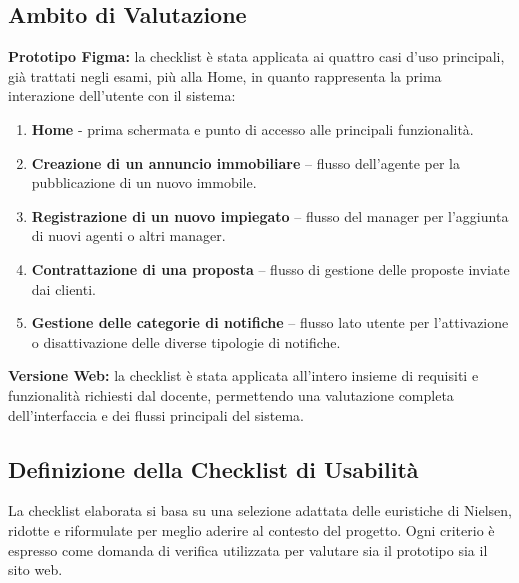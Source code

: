 \subsection*{Ambito di Valutazione}

\textbf{Prototipo Figma:} la checklist è stata applicata ai quattro casi d’uso principali, già trattati negli esami, più alla Home, in quanto rappresenta la prima interazione dell’utente con il sistema:
\begin{enumerate}
	\item  \textbf{Home} - prima schermata e punto di accesso alle principali funzionalità.
    \item \textbf{Creazione di un annuncio immobiliare} – flusso dell’agente per la pubblicazione di un nuovo immobile.
    \item \textbf{Registrazione di un nuovo impiegato} – flusso del manager per l’aggiunta di nuovi agenti o altri manager.
    \item \textbf{Contrattazione di una proposta} – flusso di gestione delle proposte inviate dai clienti.
    \item \textbf{Gestione delle categorie di notifiche} – flusso lato utente per l’attivazione o disattivazione delle diverse tipologie di notifiche.
\end{enumerate}

\textbf{Versione Web:} la checklist è stata applicata all’intero insieme di requisiti e funzionalità richiesti dal docente, permettendo una valutazione completa dell’interfaccia e dei flussi principali del sistema.

\subsection*{Definizione della Checklist di Usabilità}

La checklist elaborata si basa su una selezione adattata delle euristiche di Nielsen, ridotte e riformulate per meglio aderire al contesto del progetto.  
Ogni criterio è espresso come domanda di verifica utilizzata per valutare sia il prototipo sia il sito web.

